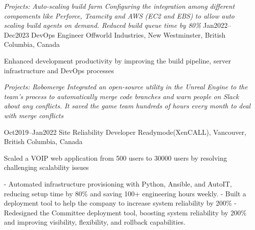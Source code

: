 \documentclass[9pt]{developercv} %
\begin{document}
\begin{entrylist}
{            \textit{Projects: Auto-scaling build farm\newline
            Configuring the integration among different compoments like Perforce, Teamcity and AWS (EC2 and EBS) to allow 
            auto scaling build agents on demand. Reduced build queue time by 80\%\newline}
        }
	\entry
		{Jan2022--Dec2023}
		{DevOps Engineer}
		{Offworld Industries, New Westminster, British Columbia, Canada}
		{
            Enhanced development productivity by improving the build pipeline, server infrastructure and DevOps processes\newline

            \textit{Projects: Robomerge\newline
            Integrated an open-source utility in the Unreal Engine to the team’s process to automatically merge code branches and warn people on Slack about any conflicts. It saved the game team hundreds of hours every month to deal with merge conflicts\newline}
        }
    \entry
		{Oct2019--Jan2022}
		{Site Reliability Developer}
		{Readymode(XenCALL), Vancouver, British Columbia, Canada}
		{
			Scaled a VOIP web application from 500 users to 30000 users by resolving challenging scalability issues\newline

            - Automated infrastructure provisioning with Python, Ansible, and AutoIT, reducing setup time by 80\% and saving 100+ engineering hours weekly.\newline
            - Built a deployment tool to help the company to increase system reliability by 200\%\newline
            - Redesigned the Committee deployment tool, boosting system reliability by 200\% and improving visibility, flexibility, and rollback capabilities.\newline

}
\end{entrylist}
\end{document}
